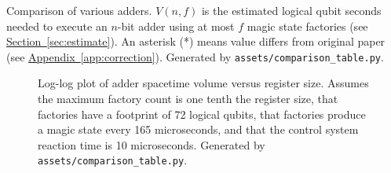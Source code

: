 \documentclass[onecolumn,unpublished]{quantumarticle}
\theoremstyle{definition}
\theoremstyle{definition}
\theoremstyle{definition}
\renewcommand{\sec}[1]{\hyperref[sec:#1]{Section~\ref*{sec:#1}}}
\DeclareRobustCommand{\app}[1]{\hyperref[app:#1]{Appendix~\ref*{app:#1}}}
\begin{document}
\begin{table}
\centering
\resizebox{\linewidth}{!}{

}
    \caption{Comparison of various adders.
    $V(n,f)$ is the estimated logical qubit seconds needed to execute an $n$-bit adder using at most $f$ magic state factories (see \sec{estimate}).
    An asterisk (*) means value differs from original paper (see \app{correction}).
    Generated by \texttt{assets/comparison\_table.py}.
    }
    \label{tbl:comparison}
\end{table}

\begin{figure}
    \centering
    \endminipage
    \endminipage
    \caption{
        Log-log plot of adder spacetime volume versus register size. Assumes the maximum factory count is one tenth the register size, that factories have a footprint of 72 logical qubits, that factories produce a magic state every 165 microseconds, and that the control system reaction time is 10 microseconds.
        Generated by \texttt{assets/comparison\_table.py}.
    }
    \label{fig:size_versus_volume}
\end{figure}
\end{document}
